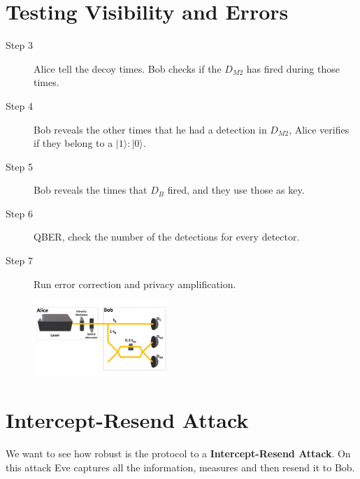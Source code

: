 \documentclass[1000pt]{article}
\newcommand{\mysection}[1]{\section*{\color{black}\sffamily #1}}%
\begin{document}

\mysection{\Huge\textbf{Testing Visibility and Errors}} \Large \vspace*{1cm}

\begin{description}

\item [Step 3] Alice tell the decoy times. Bob checks if the \textbf{$D_{M2}$} has fired during those times.

\item [Step 4] Bob reveals the other times that he had a detection in \textbf{$D_{M2}$}, Alice verifies if they belong to a $|1\rangle:|0\rangle$.

\item [Step 5] Bob reveals the times that $D_B$ fired, and they use those as key.

\item [Step 6] QBER, check the number of the detections for every detector.

\item [Step 7] Run error correction and privacy amplification.
\end{description}
\begin{figure}[hbt]
    	\centering
    	\includegraphics[width=0.45\textwidth]{./figures/Full2.pdf}
    \end{figure}

\mysection{\Huge\textbf{Intercept-Resend Attack}} \Large \vspace*{1cm}

We want to see how robust is the protocol to a \textbf{Intercept-Resend Attack}. On this attack Eve captures all the information, measures and then resend it to Bob.
\end{document}
